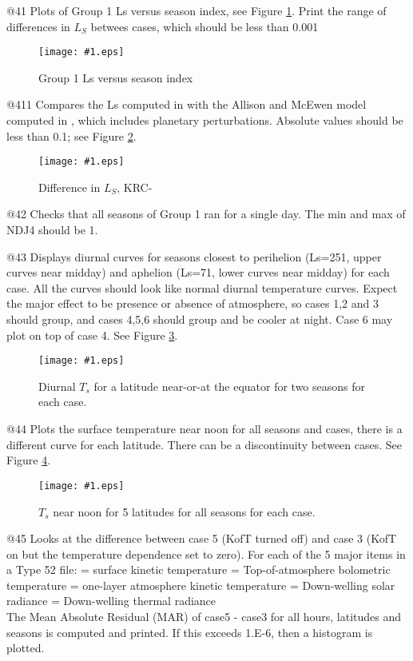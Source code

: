 \documentclass{article}  %
\newcommand{\igc}[1]{\texttt{[image: \#1.eps]}}
\begin{document}
@41 Plots of Group 1 Ls versus season index, see Figure \ref{p41}.  Print the
range of differences in $L_S$ betwees cases, which should be less than 0.001

\begin{figure}[!ht] \igc{p41}
\caption[Ls] {Group 1 Ls versus season index
\label{p41} } \end{figure}

@411 Compares the Ls computed in  with the Allison and McEwen model computed in , which includes planetary perturbations.  Absolute values should be less than 0.1; see Figure \ref{p411}. 

\begin{figure}[!ht] \igc{p411}
\caption[Ls difference] {Difference in $L_S$, KRC- 
\label{p411} } \end{figure}

@42 Checks that all seasons of Group 1 ran for a single day. The min and max of
NDJ4 should be 1.

@43 Displays diurnal curves for seasons closest to perihelion (Ls=251, upper
curves near midday) and aphelion (Ls=71, lower curves near midday) for each
case. All the curves should look like normal diurnal temperature curves. Expect
the major effect to be presence or absence of atmosphere, so cases 1,2 and 3
should group, and cases 4,5,6 should group and be cooler at night. Case 6 may
plot on top of case 4.  See Figure \ref{p43}. 

\begin{figure}[!ht] \igc{p43}
\caption[Ts versus Hour] { Diurnal $T_s$ for a latitude near-or-at the equator for two seasons for each case.
\label{p43} } \end{figure}

@44 Plots the surface temperature near noon for all seasons and cases, there is
a different curve for each latitude. There can be a discontinuity between
cases. See Figure \ref{p44}.

\begin{figure}[!ht] \igc{p44}
\caption[Ts versus season and latitude] { $T_s$ near noon for 5 latitudes for all seasons for each case.
\label{p44} } \end{figure}

@45 Looks at the difference between case 5 (KofT turned off) and case 3 (KofT on but the temperature dependence set to zero). For each of the 5 major items in a Type 52 file:
= surface kinetic temperature
= Top-of-atmosphere bolometric temperature
= one-layer atmosphere kinetic temperature
= Down-welling solar radiance 
= Down-welling thermal radiance
\\ The Mean Absolute Residual (MAR) of case5 - case3 for all hours, latitudes and seasons is computed and printed. If this exceeds 1.E-6, then a histogram is plotted.
\end{document}
